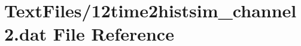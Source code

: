 \hypertarget{12time2histsim__channel2_8dat}{}\section{Text\+Files/12time2histsim\+\_\+channel2.dat File Reference}
\label{12time2histsim__channel2_8dat}
